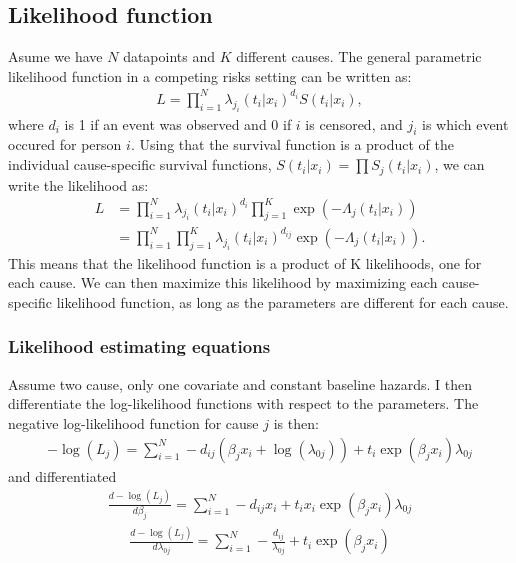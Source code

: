 \documentclass[11pt]{article}
\begin{document}
\subsection{Likelihood function}
\label{sec:orgcc46972}
Asume we have \(N\) datapoints and \(K\) different causes. The general parametric likelihood function in a competing risks setting can be written as:
\begin{align*}
L = \prod_{i = 1}^N\lambda_{j_i}(t_i|x_i)^{d_i}S(t_i|x_i),
\end{align*}
where \(d_i\) is 1 if an event was observed and 0 if \(i\) is censored, and \(j_i\) is which event occured for person \(i\). Using that the survival function is a product of the individual cause-specific survival functions, \(S(t_i|x_i) = \prod S_j(t_i|x_i)\), we can write the likelihood as:
\begin{align*}
L &= \prod_{i = 1}^N\lambda_{j_i}(t_i|x_i)^{d_i}\prod_{j = 1}^K\exp(-\Lambda_j(t_i|x_i))\\
&= \prod_{i = 1}^N\prod_{j = 1}^K\lambda_{j_i}(t_i|x_i)^{d_{ij}}\exp(-\Lambda_j(t_i|x_i)).
\end{align*}
This means that the likelihood function is a product of K likelihoods, one for each cause. We can then maximize this likelihood by maximizing each cause-specific likelihood function, as long as the parameters are different for each cause.

\subsubsection{Likelihood estimating equations}
\label{sec:org74dda67}
Assume two cause,  only one covariate and constant baseline hazards. I then differentiate the log-likelihood functions with respect to the parameters. The negative log-likelihood function for cause \(j\) is then:
\begin{align*}
-\log(L_j) = \sum_{i = 1}^N-d_{ij}(\beta_jx_i+\log(\lambda_{0j}))+t_i\exp(\beta_jx_i)\lambda_{0j}
\end{align*}
and differentiated
\begin{align*}
\frac{d-\log(L_j)}{d\beta_j} = \sum_{i = 1}^N-d_{ij}x_i+t_ix_i\exp(\beta_jx_i)\lambda_{0j}
\end{align*}
\begin{align*}
\frac{d-\log(L_j)}{d\lambda_{0j}} = \sum_{i = 1}^N-\frac{d_{ij}}{\lambda_{0j}}+t_i\exp(\beta_jx_i)
\end{align*}
\end{document}
